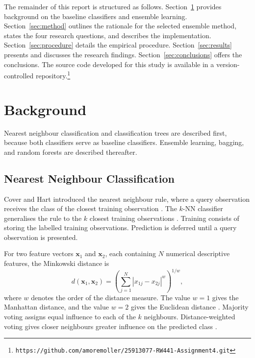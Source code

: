 \documentclass[conference]{IEEEtran}
\begin{document}
The remainder of this report is structured as follows. Section~\ref{sec:background} provides background on the baseline classifiers and ensemble learning. Section~\ref{sec:method} outlines the rationale for the selected ensemble method, states the four research questions, and describes the implementation. Section~\ref{sec:procedure} details the empirical procedure. Section~\ref{sec:results} presents and discusses the research findings. Section~\ref{sec:conclusions} offers the conclusions. The source code developed for this study is available in a version-controlled repository.\footnote{\texttt{https://github.com/amoremoller/25913077-RW441-Assignment4.git}}

\section{Background}\label{sec:background}

Nearest neighbour classification and classification trees are described first, because both classifiers serve as baseline classifiers. Ensemble learning, bagging, and random forests are described thereafter.

\subsection{Nearest Neighbour Classification}

Cover and Hart introduced the nearest neighbour rule, where a query observation receives the class of the closest training observation \cite{cover}. The $k$-NN classifier generalises the rule to the $k$ closest training observations \cite{kelleher}. Training consists of storing the labelled training observations. Prediction is deferred until a query observation is presented.

For two feature vectors $\mathbf{x}_1$ and $\mathbf{x}_2$, each containing $N$ numerical descriptive features, the Minkowski distance is
\begin{equation}
d(\mathbf{x}_1,\mathbf{x}_2)=\left(\sum_{j=1}^{N}\left|x_{1j}-x_{2j}\right|^{w}\right)^{1/w},
\label{eq:minkowski}
\end{equation}
where $w$ denotes the order of the distance measure. The value $w=1$ gives the Manhattan distance, and the value $w=2$ gives the Euclidean distance \cite{kelleher}. Majority voting assigns equal influence to each of the $k$ neighbours. Distance-weighted voting gives closer neighbours greater influence on the predicted class \cite{kelleher}.
\end{document}
